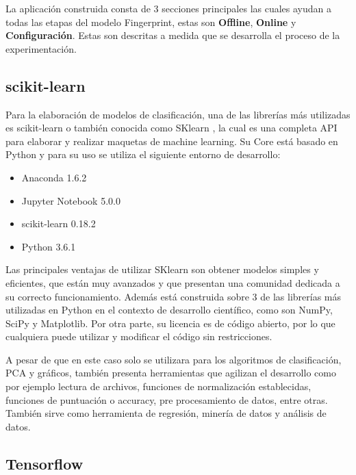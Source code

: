 La aplicación construida consta de 3 secciones principales las cuales ayudan a todas las etapas del modelo Fingerprint, estas son \textbf{Offline}, \textbf{Online} y \textbf{Configuración}. Estas son descritas a medida que se desarrolla el proceso de la experimentación.


\subsection{scikit-learn}

Para la elaboración de modelos de clasificación, una de las librerías más utilizadas es scikit-learn o también conocida como SKlearn \cite{scikit-learn}, la cual es una completa API para elaborar y realizar maquetas de machine learning. Su Core está basado en Python y para su uso se utiliza el siguiente entorno de desarrollo:

\begin{itemize}
\item Anaconda 1.6.2
\item Jupyter Notebook 5.0.0
\item scikit-learn 0.18.2
\item Python 3.6.1
\end{itemize}

Las principales ventajas de utilizar SKlearn son obtener modelos simples y eficientes, que están muy avanzados y que presentan una comunidad dedicada a su correcto funcionamiento. Además está construida sobre 3 de las librerías más utilizadas en Python en el contexto de desarrollo científico, como son NumPy, SciPy y Matplotlib. Por otra parte, su licencia es de código abierto, por lo que cualquiera puede utilizar y modificar el código sin restricciones.

A pesar de que en este caso solo se utilizara para los algoritmos de clasificación, PCA y gráficos, también presenta herramientas que agilizan el desarrollo como por ejemplo lectura de archivos, funciones de normalización establecidas, funciones de puntuación o accuracy, pre procesamiento de datos, entre otras. También sirve como herramienta de regresión, minería de datos y análisis de datos.

\subsection{ Tensorflow}

